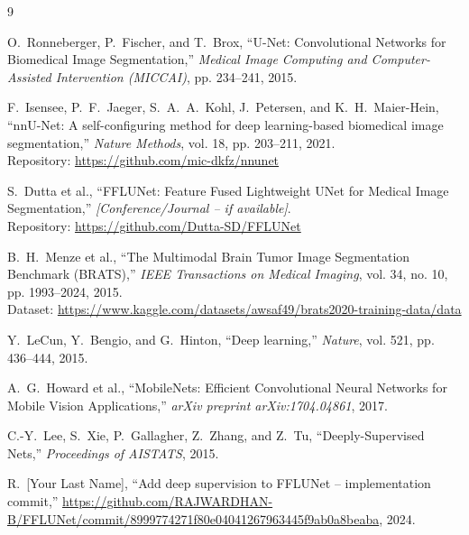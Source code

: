 \documentclass[12pt,a4paper]{report}
\begin{document}
\renewcommand{\bibname}{References}
\begin{thebibliography}{9}

O.~Ronneberger, P.~Fischer, and T.~Brox,
``U-Net: Convolutional Networks for Biomedical Image Segmentation,''
\textit{Medical Image Computing and Computer-Assisted Intervention (MICCAI)}, pp. 234--241, 2015.

F.~Isensee, P.~F.~Jaeger, S.~A.~A.~Kohl, J.~Petersen, and K.~H.~Maier-Hein,
``nnU-Net: A self-configuring method for deep learning-based biomedical image segmentation,''
\textit{Nature Methods}, vol. 18, pp. 203--211, 2021.\\
Repository: \url{https://github.com/mic-dkfz/nnunet}

S.~Dutta et al.,
``FFLUNet: Feature Fused Lightweight UNet for Medical Image Segmentation,''
\textit{[Conference/Journal -- if available]}.\\
Repository: \url{https://github.com/Dutta-SD/FFLUNet}

B.~H.~Menze et al.,
``The Multimodal Brain Tumor Image Segmentation Benchmark (BRATS),''
\textit{IEEE Transactions on Medical Imaging}, vol. 34, no. 10, pp. 1993--2024, 2015.\\
Dataset: \url{https://www.kaggle.com/datasets/awsaf49/brats2020-training-data/data}

Y.~LeCun, Y.~Bengio, and G.~Hinton,
``Deep learning,''
\textit{Nature}, vol. 521, pp. 436--444, 2015.

A.~G.~Howard et al.,
``MobileNets: Efficient Convolutional Neural Networks for Mobile Vision Applications,''
\textit{arXiv preprint arXiv:1704.04861}, 2017.

C.-Y.~Lee, S.~Xie, P.~Gallagher, Z.~Zhang, and Z.~Tu,
``Deeply-Supervised Nets,''
\textit{Proceedings of AISTATS}, 2015.

R.~[Your Last Name],
``Add deep supervision to FFLUNet -- implementation commit,''
\url{https://github.com/RAJWARDHAN-B/FFLUNet/commit/8999774271f80e04041267963445f9ab0a8beaba},
2024.

\end{thebibliography}

\appendix
\end{document}
